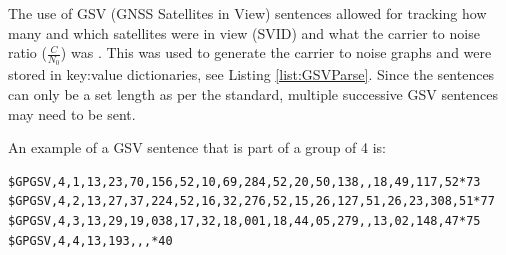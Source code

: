 The use of GSV (GNSS Satellites in View) sentences allowed for tracking how many and which satellites were in view (SVID) and what the carrier to noise ratio
($\frac{C}{N_0}$) was \cite{RN71}. This was used to generate the carrier to
noise graphs and were stored in key:value dictionaries, see Listing \ref{list:GSVParse}. Since the sentences can only be a set length as per the standard, multiple successive GSV sentences may need to be sent.

An example of a GSV sentence that is part of a group of 4 is:
\begin{verbatim}
$GPGSV,4,1,13,23,70,156,52,10,69,284,52,20,50,138,,18,49,117,52*73
$GPGSV,4,2,13,27,37,224,52,16,32,276,52,15,26,127,51,26,23,308,51*77
$GPGSV,4,3,13,29,19,038,17,32,18,001,18,44,05,279,,13,02,148,47*75
$GPGSV,4,4,13,193,,,*40
\end{verbatim}

